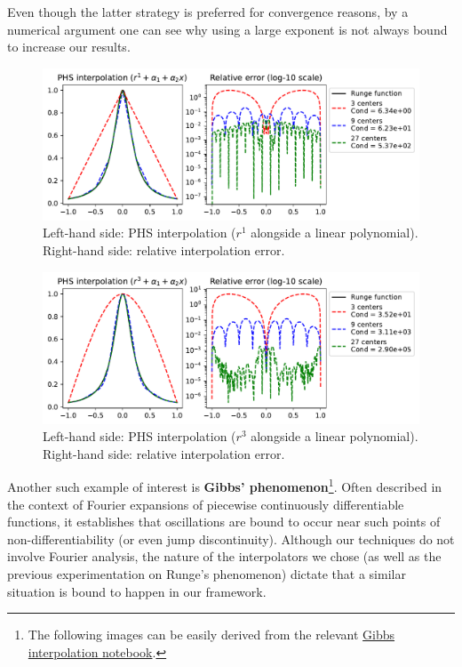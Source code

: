 \documentclass[12pt]{report} %
\begin{document}
Even though the latter strategy is preferred for convergence reasons, by a numerical argument one can see why using a large exponent is not always bound to increase our results.

\begin{figure}[ht]
  \centering
  \includegraphics[width=\textwidth]{imagenes/phs_interpolation/runge_phs_r1_deg1.pdf}
  \caption{Left-hand side: PHS interpolation ($r^1$ alongside a linear polynomial). Right-hand side: relative interpolation error.}
  \label{fig:phs-runge-phenomenon-deg-1-discussion}
\end{figure}

\begin{figure}[ht]
  \centering
  \includegraphics[width=\textwidth]{imagenes/phs_interpolation/runge_phs_r3_deg1.pdf}
  \caption{Left-hand side: PHS interpolation ($r^3$ alongside a linear polynomial). Right-hand side: relative interpolation error.}
  \label{fig:phs-runge-phenomenon-deg-3-discussion}
\end{figure}


Another such example of interest is \textbf{Gibbs' phenomenon}\footnote{The following images can be easily derived from the relevant \href{https://github.com/heqro/tfm-experiments/blob/main/introductory_notebooks/rbf_interpolation/gibbs_rbf_and_phs.ipynb}{Gibbs interpolation notebook}.}. Often described in the context of Fourier expansions of piecewise continuously differentiable functions, it establishes that oscillations are bound to occur near such points of non-differentiability (or even jump discontinuity).
Although our techniques do not involve Fourier analysis, the nature of the interpolators we chose (as well as the previous experimentation on Runge's phenomenon) dictate that a similar situation is bound to happen in our framework.
\end{document}
